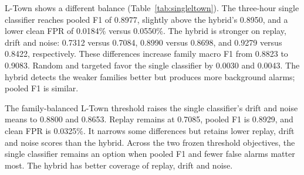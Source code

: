 L-Town shows a different balance (Table~\ref{tab:singleltown}). The three-hour single classifier reaches pooled F1 of 0.8977, slightly above the hybrid's 0.8950, and a lower clean FPR of 0.0184\% versus 0.0550\%. The hybrid is stronger on replay, drift and noise: 0.7312 versus 0.7084, 0.8990 versus 0.8698, and 0.9279 versus 0.8422, respectively. These differences increase family macro F1 from 0.8823 to 0.9083. Random and targeted favor the single classifier by 0.0030 and 0.0043. The hybrid detects the weaker families better but produces more background alarms; pooled F1 is similar.

The family-balanced L-Town threshold raises the single classifier's drift and noise means to 0.8800 and 0.8653. Replay remains at 0.7085, pooled F1 is 0.8929, and clean FPR is 0.0325\%. It narrows some differences but retains lower replay, drift and noise scores than the hybrid. Across the two frozen threshold objectives, the single classifier remains an option when pooled F1 and fewer false alarms matter most. The hybrid has better coverage of replay, drift and noise.
